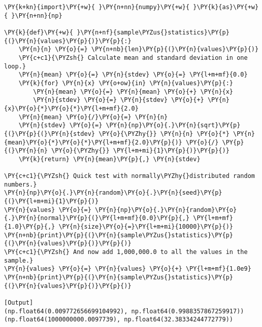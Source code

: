 \begin{Verbatim}[label=\makebox{\href{https://github.com/unipi-physics-labs/statnotes/tree/main/snippy/sample_stat2.py}{https://github.com/.../sample\_stat2.py}},commandchars=\\\{\}]
\PY{k+kn}{import}\PY{+w}{ }\PY{n+nn}{numpy}\PY{+w}{ }\PY{k}{as}\PY{+w}{ }\PY{n+nn}{np}

\PY{k}{def}\PY{+w}{ }\PY{n+nf}{sample\PYZus{}statistics}\PY{p}{(}\PY{n}{values}\PY{p}{)}\PY{p}{:}
    \PY{n}{n} \PY{o}{=} \PY{n+nb}{len}\PY{p}{(}\PY{n}{values}\PY{p}{)}
    \PY{c+c1}{\PYZsh{} Calculate mean and standard deviation in one loop.}
    \PY{n}{mean} \PY{o}{=} \PY{n}{stdev} \PY{o}{=} \PY{l+m+mf}{0.0}
    \PY{k}{for} \PY{n}{x} \PY{o+ow}{in} \PY{n}{values}\PY{p}{:}
        \PY{n}{mean} \PY{o}{=} \PY{n}{mean} \PY{o}{+} \PY{n}{x}
        \PY{n}{stdev} \PY{o}{=} \PY{n}{stdev} \PY{o}{+} \PY{n}{x}\PY{o}{*}\PY{o}{*}\PY{l+m+mf}{2.0}
    \PY{n}{mean} \PY{o}{/}\PY{o}{=} \PY{n}{n}
    \PY{n}{stdev} \PY{o}{=} \PY{n}{np}\PY{o}{.}\PY{n}{sqrt}\PY{p}{(}\PY{p}{(}\PY{n}{stdev} \PY{o}{\PYZhy{}} \PY{n}{n} \PY{o}{*} \PY{n}{mean}\PY{o}{*}\PY{o}{*}\PY{l+m+mf}{2.0}\PY{p}{)} \PY{o}{/} \PY{p}{(}\PY{n}{n} \PY{o}{\PYZhy{}} \PY{l+m+mi}{1}\PY{p}{)}\PY{p}{)}
    \PY{k}{return} \PY{n}{mean}\PY{p}{,} \PY{n}{stdev}

\PY{c+c1}{\PYZsh{} Quick test with normally\PYZhy{}distributed random numbers.}
\PY{n}{np}\PY{o}{.}\PY{n}{random}\PY{o}{.}\PY{n}{seed}\PY{p}{(}\PY{l+m+mi}{1}\PY{p}{)}
\PY{n}{values} \PY{o}{=} \PY{n}{np}\PY{o}{.}\PY{n}{random}\PY{o}{.}\PY{n}{normal}\PY{p}{(}\PY{l+m+mf}{0.0}\PY{p}{,} \PY{l+m+mf}{1.0}\PY{p}{,} \PY{n}{size}\PY{o}{=}\PY{l+m+mi}{10000}\PY{p}{)}
\PY{n+nb}{print}\PY{p}{(}\PY{n}{sample\PYZus{}statistics}\PY{p}{(}\PY{n}{values}\PY{p}{)}\PY{p}{)}
\PY{c+c1}{\PYZsh{} And now add 1,000,000.0 to all the values in the sample.}
\PY{n}{values} \PY{o}{=} \PY{n}{values} \PY{o}{+} \PY{l+m+mf}{1.0e9}
\PY{n+nb}{print}\PY{p}{(}\PY{n}{sample\PYZus{}statistics}\PY{p}{(}\PY{n}{values}\PY{p}{)}\PY{p}{)}

[Output]
(np.float64(0.009772656699104992), np.float64(0.9988357867259917))
(np.float64(1000000000.0097739), np.float64(32.38334244772779))
\end{Verbatim}
